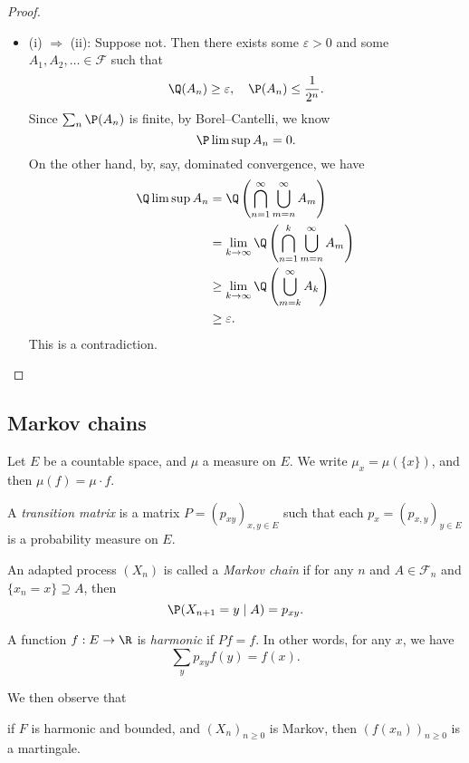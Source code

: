 \documentclass[a4paper]{article}
\begin{document}
\begin{proof}
\begin{itemize}
    \item (i) $\Rightarrow$ (ii): Suppose not. Then there exists some $\varepsilon > 0$ and some $A_1, A_2, \ldots \in \mathcal{F}$ such that
      \[
        \Q(A_n) \geq \varepsilon,\quad \P(A_n) \leq \frac{1}{2^n}.
      \]
      Since $\sum_n \P(A_n)$ is finite, by Borel--Cantelli, we know
      \[
        \P \limsup A_n = 0.
      \]
      On the other hand, by, say, dominated convergence, we have
      \begin{align*}
        \Q\limsup A_n &= \Q \left(\bigcap_{n = 1}^\infty \bigcup_{m = n}^\infty A_m\right) \\
        &= \lim_{k \to \infty} \Q\left(\bigcap_{n = 1}^k \bigcup_{m = n}^\infty A_m \right)\\
        &\geq \lim_{k \to \infty} \Q \left(\bigcup_{m = k}^\infty A_k\right)\\
        &\geq \varepsilon.
      \end{align*}
      This is a contradiction.
  \end{itemize}
\end{proof}

\subsection{Markov chains}
Let $E$ be a countable space, and $\mu$ a measure on $E$. We write $\mu_x = \mu(\{x\})$, and then $\mu(f) = \mu \cdot f$.

\begin{defi}
  A \emph{transition matrix} is a matrix $P = (p_{xy})_{x, y \in E}$ such that each $p_x = (p_{x, y})_{y \in E}$ is a probability measure on $E$.
\end{defi}

\begin{defi}
  An adapted process $(X_n)$ is called a \emph{Markov chain} if for any $n$ and $A \in \mathcal{F}_n$ and $\{x_n = x\} \supseteq A$, then
  \[
    \P(X_{n + 1} = y\mid A) = p_{xy}.
  \]
\end{defi}

\begin{defi}
  A function $f: E \to \R$ is \emph{harmonic} if $Pf = f$. In other words, for any $x$, we have
  \[
    \sum_{y} p_{xy} f(y) = f(x).
  \]
\end{defi}
We then observe that

\begin{prop}
  if $F$ is harmonic and bounded, and $(X_n)_{n \geq 0}$ is Markov, then $(f(x_n))_{n \geq 0}$ is a martingale.
\end{prop}
\end{document}
